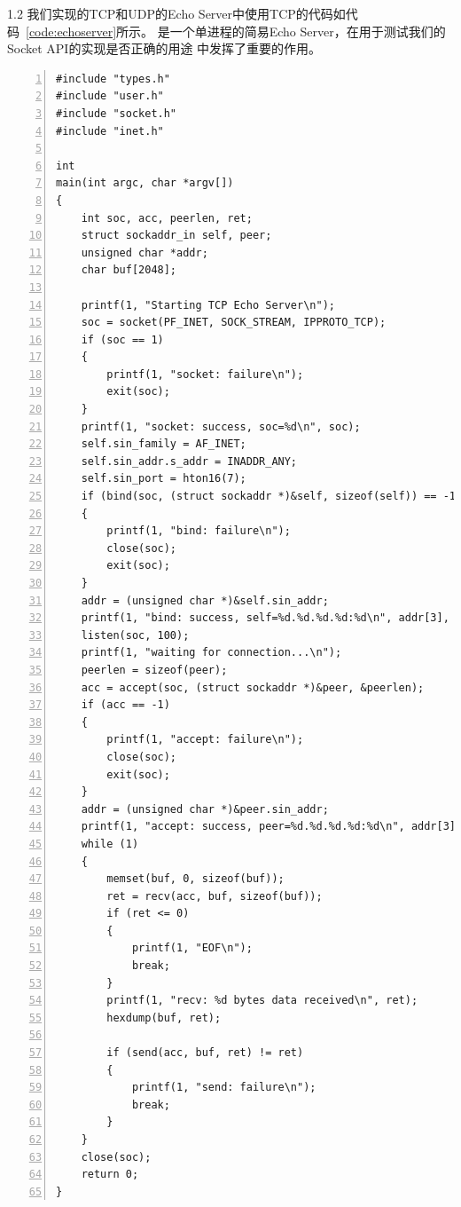 \documentclass[a4paper,twoside]{ctexrep}
\begin{document}
\begin{spacing}{1.2}
我们实现的TCP和UDP的Echo Server中使用TCP的代码如代码~\ref{code:echoserver}所示。
是一个单进程的简易Echo Server，在用于测试我们的Socket API的实现是否正确的用途
中发挥了重要的作用。

\begin{lstlisting}[numbers=left,style=CppStyle,caption={TCP Echo Server},label={code:echoserver}]
#include "types.h"
#include "user.h"
#include "socket.h"
#include "inet.h"

int
main(int argc, char *argv[])
{
	int soc, acc, peerlen, ret;
	struct sockaddr_in self, peer;
	unsigned char *addr;
	char buf[2048];

	printf(1, "Starting TCP Echo Server\n");
	soc = socket(PF_INET, SOCK_STREAM, IPPROTO_TCP);
	if (soc == 1)
	{
		printf(1, "socket: failure\n");
		exit(soc);
	}
	printf(1, "socket: success, soc=%d\n", soc);
	self.sin_family = AF_INET;
	self.sin_addr.s_addr = INADDR_ANY;
	self.sin_port = hton16(7);
	if (bind(soc, (struct sockaddr *)&self, sizeof(self)) == -1)
	{
		printf(1, "bind: failure\n");
		close(soc);
		exit(soc);
	}
	addr = (unsigned char *)&self.sin_addr;
	printf(1, "bind: success, self=%d.%d.%d.%d:%d\n", addr[3], addr[2], addr[1], addr[0], ntoh16(self.sin_port));
	listen(soc, 100);
	printf(1, "waiting for connection...\n");
	peerlen = sizeof(peer);
	acc = accept(soc, (struct sockaddr *)&peer, &peerlen);
	if (acc == -1)
	{
		printf(1, "accept: failure\n");
		close(soc);
		exit(soc);
	}
	addr = (unsigned char *)&peer.sin_addr;
	printf(1, "accept: success, peer=%d.%d.%d.%d:%d\n", addr[3], addr[2], addr[1], addr[0], ntoh16(peer.sin_port));
	while (1)
	{
		memset(buf, 0, sizeof(buf));
		ret = recv(acc, buf, sizeof(buf));
		if (ret <= 0)
		{
			printf(1, "EOF\n");
			break;
		}
		printf(1, "recv: %d bytes data received\n", ret);
		hexdump(buf, ret);

		if (send(acc, buf, ret) != ret)
		{
			printf(1, "send: failure\n");
			break;
		}
	}
	close(soc);
	return 0;
}
\end{lstlisting}


\end{spacing}
\end{document}
